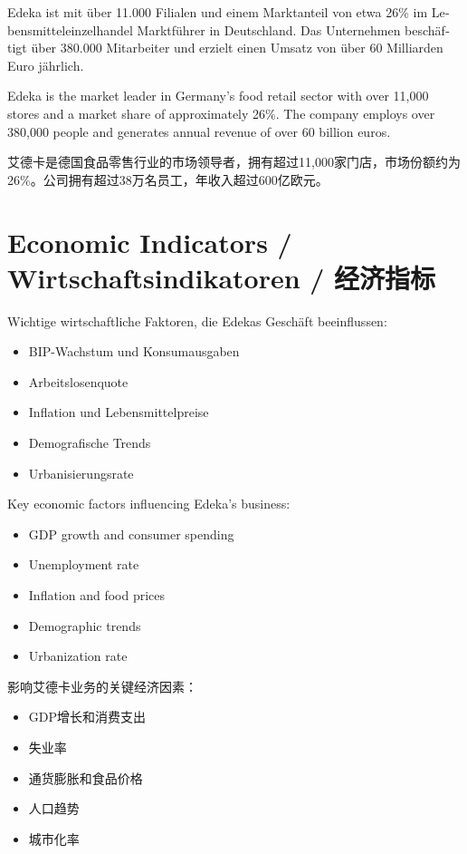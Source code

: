 \begin{otherlanguage}{ngerman}
Edeka ist mit über 11.000 Filialen und einem Marktanteil von etwa 26\% im Lebensmitteleinzelhandel Marktführer in Deutschland. Das Unternehmen beschäftigt über 380.000 Mitarbeiter und erzielt einen Umsatz von über 60 Milliarden Euro jährlich.
\end{otherlanguage}

Edeka is the market leader in Germany's food retail sector with over 11,000 stores and a market share of approximately 26\%. The company employs over 380,000 people and generates annual revenue of over 60 billion euros.

艾德卡是德国食品零售行业的市场领导者，拥有超过11,000家门店，市场份额约为26\%。公司拥有超过38万名员工，年收入超过600亿欧元。

\section{Economic Indicators / Wirtschaftsindikatoren / 经济指标}

\begin{otherlanguage}{ngerman}
Wichtige wirtschaftliche Faktoren, die Edekas Geschäft beeinflussen:
\begin{itemize}
    \item BIP-Wachstum und Konsumausgaben
    \item Arbeitslosenquote
    \item Inflation und Lebensmittelpreise
    \item Demografische Trends
    \item Urbanisierungsrate
\end{itemize}
\end{otherlanguage}

Key economic factors influencing Edeka's business:
\begin{itemize}
    \item GDP growth and consumer spending
    \item Unemployment rate
    \item Inflation and food prices
    \item Demographic trends
    \item Urbanization rate
\end{itemize}

影响艾德卡业务的关键经济因素：
\begin{itemize}
    \item GDP增长和消费支出
    \item 失业率
    \item 通货膨胀和食品价格
    \item 人口趋势
    \item 城市化率
\end{itemize}

